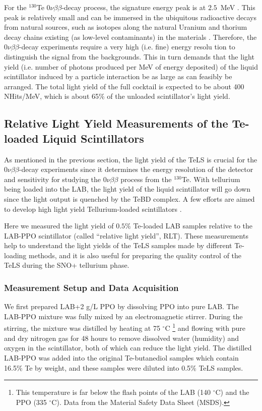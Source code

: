 For the $^{130}${Te} $0\nu\beta\beta$-decay process, the signature energy peak is at $2.5$~MeV \cite{whitepaper}. This peak is relatively small and can be immersed in the ubiquitous radioactive decays from natural sources, such as isotopes along the natural Uranium and thorium decay chains existing (as low-level contaminants) in the materials \cite{whitepaper}. Therefore, the $0\nu\beta\beta$-decay experiments require a very high (i.e. fine) energy resolu tion to distinguish the signal from the backgrounds. This in turn demands that the light yield (i.e. number of photons produced per MeV of energy deposited) of the liquid scintillator induced by a particle interaction be as large as can feasibly be arranged. The total light yield of the full cocktail is expected to be about 400 NHits/MeV, which is about 65\% of the unloaded scintillator's light yield.

\subsection{Relative Light Yield Measurements of the Te-loaded Liquid Scintillators}

As mentioned in the previous section, the light yield of the TeLS is crucial for the $0\nu\beta\beta$-decay experiments since it determines the energy resolution of the detector and sensitivity for studying the $0\nu\beta\beta$ process from the $^{130}$Te. With tellurium being loaded into the LAB, the light yield of the liquid scintillator will go down since the light output is quenched by the TeBD complex. A few efforts are aimed to develop high light yield Tellurium-loaded scintillators \cite{biller2017new}.

Here we measured the light yield of $0.5\%$ Te-loaded LAB samples relative to the LAB-PPO scintillator (called ``relative light yield'', RLT). These measurements help to understand the light yields of the TeLS samples made by different Te-loading methods, and it is also useful for preparing the quality control of the TeLS during the SNO+ tellurium phase.

\subsubsection{Measurement Setup and Data Acquisition}

We first prepared LAB+2 g/L PPO by dissolving PPO into pure LAB. The LAB-PPO mixture was fully mixed by an electromagnetic stirrer. During the stirring, the mixture was distilled by heating at 75 $^\circ$C \footnote{This temperature is far below the flash points of the LAB (140 $^\circ$C) and the PPO (335 $^\circ$C). Data from the Material Safety Data Sheet (MSDS).} and flowing with pure and dry nitrogen gas for 48 hours to remove dissolved water (humidity) and oxygen in the scintillator, both of which can reduce the light yield. The distilled LAB-PPO was added into the original Te-butanediol samples which contain 16.5\% Te by weight, and these samples were diluted into 0.5\% TeLS samples. 

